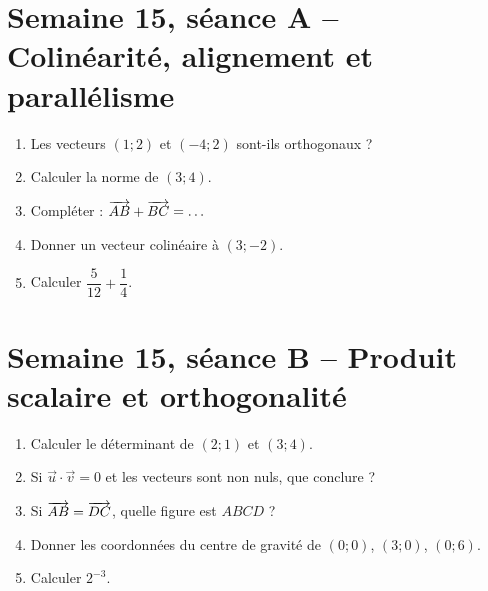 \section{Semaine 15, séance A -- Colinéarité, alignement et parallélisme}
\begin{enumerate}
  \item Les vecteurs $(1;2)$ et $(-4;2)$ sont-ils orthogonaux ?
  \item Calculer la norme de $(3;4)$.
  \item Compléter : $\overrightarrow{AB}+\overrightarrow{BC}=\ldots$
  \item Donner un vecteur colinéaire à $(3;-2)$.
  \item Calculer $\dfrac{5}{12}+\dfrac14$.
\end{enumerate}

\section{Semaine 15, séance B -- Produit scalaire et orthogonalité}
\begin{enumerate}
  \item Calculer le déterminant de $(2;1)$ et $(3;4)$.
  \item Si $\vec u\cdot\vec v=0$ et les vecteurs sont non nuls, que conclure ?
  \item Si $\overrightarrow{AB}=\overrightarrow{DC}$, quelle figure est $ABCD$ ?
  \item Donner les coordonnées du centre de gravité de $(0;0)$, $(3;0)$, $(0;6)$.
  \item Calculer $2^{-3}$.
\end{enumerate}

